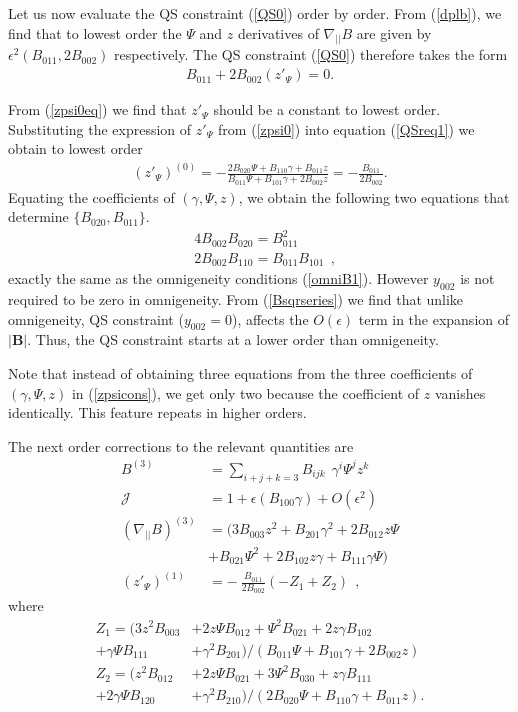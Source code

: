 \documentclass[aip,pop,reprint]{revtex4-1}
\newcommand*{\ep}{\epsilon}
\newcommand*{\B}{\bm{B}}
\newcommand*{\Jac}{\mathscr{J}}
\newcommand*{\dpl}{\nabla_{||}}
\begin{document}
Let us now evaluate the QS constraint (\ref{QS0}) order by order. From (\ref{dplb}), we find that to lowest order the $\Psi$ and $z$ derivatives of $\dpl B$ are given by $\ep^2(B_{011},2B_{002})$ respectively. The QS constraint (\ref{QS0}) therefore takes the form
\begin{align}
B_{011}+2B_{002}(z'_\Psi)=0.
\label{zpsi0eq}
\end{align}



From (\ref{zpsi0eq}) we find that $z'_\Psi$ should be a constant to lowest order. Substituting the expression of $z'_\Psi$ from (\ref{zpsi0}) into equation (\ref{QSreq1}) we obtain to lowest order
\begin{align}
(z'_\Psi)^{(0)}=-\frac{2 B_{020}\Psi +B_{110}\gamma +B_{011}z}{B_{011}\Psi +B_{101}\gamma +2B_{002}z}=-\frac{B_{011}}{2B_{002}}.
\label{zpsicons}
\end{align}
Equating the coefficients of $(\gamma,\Psi,z)$, we obtain the following two equations that determine $\{B_{020},B_{011}\}$. 
\begin{align}
&4 B_{002}B_{020}=B_{011}^2\nonumber \\
&2 B_{002}B_{110}=B_{011}B_{101}\:\:, \label{QS2eq}
\end{align}
exactly the same as the omnigeneity conditions (\ref{omniB1}).  However $y_{002}$ is not required to be zero in omnigeneity. From (\ref{Bsqrseries}) we find that unlike omnigeneity, QS constraint  ($y_{002}=0$), affects the $O(\epsilon)$ term in the expansion of $|\B|$. Thus, the QS constraint starts at a lower order than omnigeneity. 

Note that instead of obtaining three equations from the three coefficients of $(\gamma,\Psi,z)$ in (\ref{zpsicons}), we get only two because the coefficient of $z$ vanishes identically. This feature repeats  in higher orders. 

The next order corrections to the relevant quantities are 
\begin{subequations}
\begin{align}
B^{(3)}&= \sum_{i+j+k=3}B_{ijk}\:\:\gamma^i\Psi^j z^k\\
\Jac&=1+ \ep (B_{100}\gamma) +O(\ep^2)\\
(\dpl B)^{(3)} &= ( 3 B_{003}z^2+B_{201}\gamma^2+2 B_{012}z\Psi  \nonumber\\ 
&+B_{021}\Psi^2+2B_{102}z \gamma +B_{111}\gamma\Psi)\\
(z'_\Psi)^{(1)}&= -\: \frac{B_{011}}{2B_{002}}(-Z_1+Z_2)\:\:,\label{zpsi1}
\end{align}
\end{subequations}
where
\begin{align*}
Z_1=( 3 z^2 B_{003} &+2 z \Psi B_{012}+\Psi^2 B_{021} +2 z \gamma B_{102}\\
+ \gamma \Psi B_{111} &+ \gamma^2 B_{201} )/(B_{011}\Psi +B_{101}\gamma +2B_{002}z) \\
Z_2=( z^2 B_{012} &+2 z \Psi B_{021}+3\Psi^2 B_{030}+  z \gamma B_{111}\\
+ 2\gamma \Psi B_{120} &+ \gamma^2 B_{210} )/(2 B_{020}\Psi +B_{110}\gamma +B_{011}z).
\end{align*}
\end{document}

